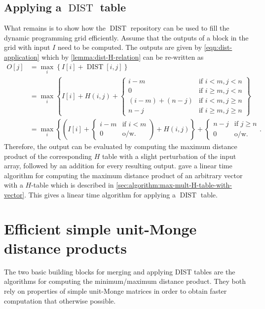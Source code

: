 \documentclass[twoside,11pt,openright]{report}
\newcommand{\DIST}{\operatorname{DIST}}
\begin{document}
\subsection{Applying a $\DIST$ table}
\label{sec:applying-a-dist-table}
What remains is to show how the $\DIST$ repository can be used to fill the dynamic programming grid efficiently. Assume that the outputs of a block in the grid with input $I$ need to be computed. The outputs are given by \cref{eqn:dist-application} which by \cref{lemma:dist-H-relation} can be re-written as
\begin{align*}
  O[j] &= \max_i \left\{ I[i] + \DIST[i, j] \right\} \\
    &= \max_i \left\{ I[i] + H(i, j) + \left\{
      \begin{array}{ll}
        i - m             & \text{if } i < m, j < n \\
        0                 & \text{if } i \geq m, j < n \\
        (i - m) + (n - j) & \text{if } i < m, j \geq n \\
        n - j             & \text{if } i \geq m, j \geq n
      \end{array}
    \right. \right\} \\
    &= \max_i\left\{ \left( I[i] + \left\{
      \begin{array}{ll}
        i - m     & \text{if } i < m \\
        0         & \text{o/w.}
      \end{array}
    \right. \right) + H(i, j) \right\} + \left\{
      \begin{array}{ll}
        n - j     & \text{if } j \geq n \\
        0         & \text{o/w.}
      \end{array}
    \right. .
\end{align*}
Therefore, the output can be evaluated by computing the maximum distance product of the corresponding $H$ table with a slight perturbation of the input array, followed by an addition for every resulting output. \cite{Gawrychowski:2012:FAC:2422024.2422048} gave a linear time algorithm for computing the maximum distance product of an arbitrary vector with a $H$-table which is described in \cref{sec:algorithm:max-mult-H-table-with-vector}. This gives a linear time algorithm for applying a $\DIST$ table.

\section{Efficient simple unit-Monge distance products}
The two basic building blocks for merging and applying DIST tables are the algorithms for computing the minimum/maximum distance product. They both rely on properties of simple unit-Monge matrices in order to obtain faster computation that otherwise possible.
\end{document}
